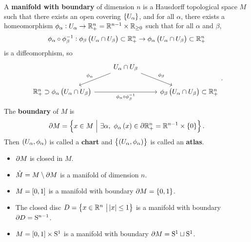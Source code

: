 \begin{definition}
A \textbf{manifold with boundary} of dimension $ n $ is a Hausdorff topological space $ M $ such that there exists an open covering $ \cbr{U_\alpha} $, and for all $ \alpha $, there exists a homeomorphism $ \phi_\alpha : U_\alpha \to \mathbb{R}_+^n = \mathbb{R}^{n - 1} \times \mathbb{R}_{\ge 0} $ such that for all $ \alpha $ and $ \beta $,
$$ \phi_\alpha \circ \phi_\beta^{-1} : \phi_\beta\br{U_\alpha \cap U_\beta} \subset \RR_+^n \to \phi_\alpha\br{U_\alpha \cap U_\beta} \subset \RR_+^n $$
is a diffeomorphism, so
$$
\begin{tikzcd}
& U_\alpha \cap U_\beta \arrow{dl}[swap]{\phi_\alpha} \arrow{dr}{\phi_\beta} & \\
\RR_+^n \supset \phi_\alpha\br{U_\alpha \cap U_\beta} \arrow{rr}[swap]{\phi_\alpha \circ \phi_\beta^{-1}} & & \phi_\beta\br{U_\alpha \cap U_\beta} \subset \RR_+^n
\end{tikzcd}.
$$
The \textbf{boundary} of $ M $ is
$$ \da M = \cbr{x \in M \st \exists \alpha, \ \phi_\alpha\br{x} \in \da\RR_+^n = \RR^{n - 1} \times \cbr{0}}. $$
Then $ \br{U_\alpha, \phi_\alpha} $ is called a \textbf{chart} and $ \cbr{\br{U_\alpha, \phi_\alpha}} $ is called an \textbf{atlas}.
\end{definition}

\begin{remark}
\hfill
\begin{itemize}
\item $ \partial M $ is closed in $ M $.
\item $ \mathring{M} = M \setminus \partial M $ is a manifold of dimension $ n $.
\end{itemize}
\end{remark}

\begin{example}
\hfill
\begin{itemize}
\item $ M = \sbr{0, 1} $ is a manifold with boundary $ \da M = \cbr{0, 1} $.
\item The closed disc $ D = \cbr{x \in \RR^n \st \abs{x} \le 1} $ is a manifold with boundary $ \partial D = \mathrm{S}^{n - 1} $.
\item $ M = \sbr{0, 1} \times \S^1 $ is a manifold with boundary $ \partial M = \mathrm{S}^1 \sqcup \mathrm{S}^1 $.
\end{itemize}
\end{example}


